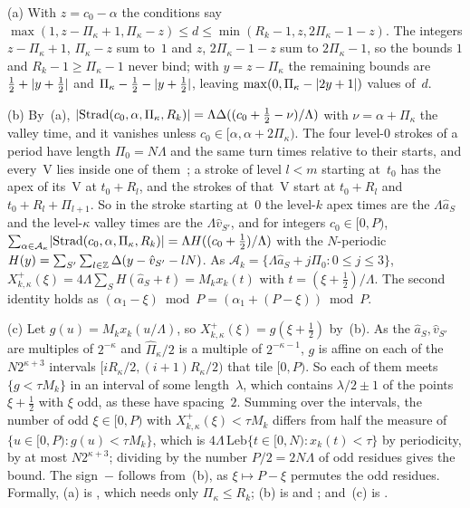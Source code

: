 \begin{outline}
(a) With $z=c_0-\alpha$ the conditions say $\max(1,z-\Pi_\kappa+1,\Pi_\kappa-z)\le d\le\min(R_k-1,z,2\Pi_\kappa-1-z)$.
The integers $z-\Pi_\kappa+1$, $\Pi_\kappa-z$ sum to~$1$ and $z$, $2\Pi_\kappa-1-z$ sum to $2\Pi_\kappa-1$, so the bounds
$1$ and $R_k-1\ge\Pi_\kappa-1$ never bind; with $y=z-\Pi_\kappa$ the remaining bounds are $\frac12+\lvert y+\frac12 \rvert$ and
$\Pi_\kappa-\frac12-\lvert y+\frac12 \rvert$, leaving $\max(0,\Pi_\kappa-\lvert 2y+1 \rvert)$ values of~$d$.

(b) By~(a), $\lvert \mathrm{Strad}(c_0,\alpha,\Pi_\kappa,R_k) \rvert=\Lambda\Delta((c_0+\frac12-\nu)/\Lambda)$ with
$\nu=\alpha+\Pi_\kappa$ the valley time, and it vanishes unless $c_0\in[\alpha,\alpha+2\Pi_\kappa)$. The four level-$0$
strokes of a period have length $\Pi_0=N\Lambda$ and the same turn times relative to their starts, and every~V lies inside
one of them~\cite[Section~2.5]{BoundedNesting2026}; a stroke of level $l<m$ starting at~$t_0$ has the apex of its~V at
$t_0+R_l$, and the strokes of that~V start at $t_0+R_l$ and $t_0+R_l+\Pi_{l+1}$. So in the stroke starting at~$0$ the
level-$k$ apex times are the $\Lambda\hat a_S$ and the level-$\kappa$ valley times are the $\Lambda\hat v_{S'}$, and for
integers $c_0\in[0,P)$,
$\sum_{\alpha\in\mathcal A_\kappa}\lvert \mathrm{Strad}(c_0,\alpha,\Pi_\kappa,R_k) \rvert=\Lambda H((c_0+\frac12)/\Lambda)$ with the
$N$-periodic $H(y)=\sum_{S'}\sum_{l\in\mathbb{Z}}\Delta(y-\hat v_{S'}-lN)$. As $\mathcal A_k=\{\Lambda\hat a_S+j\Pi_0:0\le j\le3\}$,
$X^+_{k,\kappa}(\xi)=4\Lambda\sum_SH(\hat a_S+t)=M_kx_k(t)$ with $t=(\xi+\frac12)/\Lambda$. The second identity holds as
$(\alpha_1-\xi)\bmod P=(\alpha_1+(P-\xi))\bmod P$.

(c) Let $g(u)=M_kx_k(u/\Lambda)$, so $X^+_{k,\kappa}(\xi)=g(\xi+\frac12)$ by~(b). As the $\hat a_S,\hat v_{S'}$ are
multiples of $2^{-\kappa}$ and $\hat\Pi_\kappa/2$ is a multiple of $2^{-\kappa-1}$, $g$ is affine on each of the $N2^{\kappa+3}$
intervals $[iR_\kappa/2,(i+1)R_\kappa/2)$ that tile $[0,P)$. So each of them meets $\{g<\tau M_k\}$ in an interval of some
length~$\lambda$, which contains $\lambda/2\pm1$ of the points $\xi+\frac12$ with $\xi$ odd, as these have spacing~$2$.
Summing over the intervals, the number of odd $\xi\in[0,P)$ with $X^+_{k,\kappa}(\xi)<\tau M_k$ differs from half the measure
of $\{u\in[0,P):g(u)<\tau M_k\}$, which is $4\Lambda\,\mathrm{Leb}\{t\in[0,N):x_k(t)<\tau\}$ by periodicity, by at most
$N2^{\kappa+3}$; dividing by the number $P/2=2N\Lambda$ of odd residues gives the bound. The sign~$-$ follows from~(b), as
$\xi\mapsto P-\xi$ permutes the odd residues.
Formally, (a) is , which needs only $\Pi_\kappa\le R_k$; (b) is
 and ; and~(c) is
.
\end{outline}

